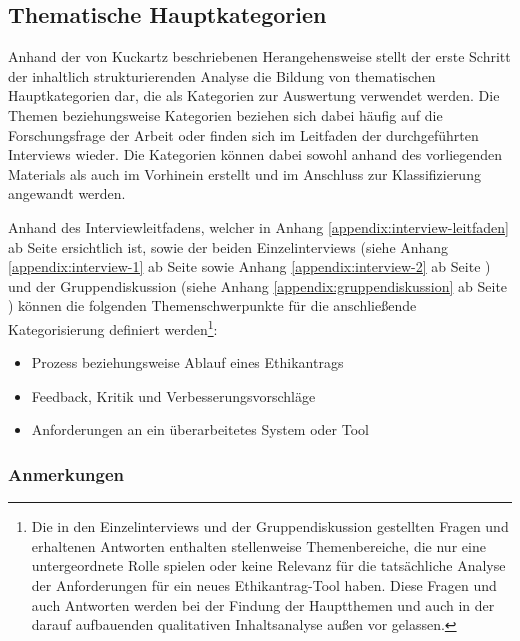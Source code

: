 \documentclass[a4paper,12pt,twoside,numbers=noendperiod]{scrreprt}
\begin{document}
\subsection{Thematische Hauptkategorien}
\label{sub-sec:thematische-hauptkategorien}

Anhand der von Kuckartz beschriebenen Herangehensweise stellt der erste Schritt der inhaltlich strukturierenden Analyse die Bildung von thematischen Hauptkategorien dar, die als Kategorien zur Auswertung verwendet werden. Die Themen beziehungsweise Kategorien beziehen sich dabei häufig auf die Forschungsfrage der Arbeit oder finden sich im Leitfaden der durchgeführten Interviews wieder. Die Kategorien können dabei sowohl anhand des vorliegenden Materials als auch im Vorhinein erstellt und im Anschluss zur Klassifizierung angewandt werden. \cite[101\psq]{kuckartz_qualitative_2018}

\medskip

Anhand des Interviewleitfadens, welcher in Anhang \ref{appendix:interview-leitfaden} ab Seite \pageref{appendix:interview-leitfaden} ersichtlich ist, sowie der beiden Einzelinterviews (siehe Anhang \ref{appendix:interview-1} ab Seite \pageref{appendix:interview-1} sowie Anhang \ref{appendix:interview-2} ab Seite \pageref{appendix:interview-2}) und der Gruppendiskussion (siehe Anhang \ref{appendix:gruppendiskussion} ab Seite \pageref{appendix:gruppendiskussion}) können die folgenden Themenschwerpunkte für die anschließende Kategorisierung definiert werden\footnote{Die in den Einzelinterviews und der Gruppendiskussion gestellten Fragen und erhaltenen Antworten enthalten stellenweise Themenbereiche, die nur eine untergeordnete Rolle spielen oder keine Relevanz für die tatsächliche Analyse der Anforderungen für ein neues Ethikantrag-Tool haben. Diese Fragen und auch Antworten werden bei der Findung der Hauptthemen und auch in der darauf aufbauenden qualitativen Inhaltsanalyse außen vor gelassen.}:
\begin{itemize}
    \item Prozess beziehungsweise Ablauf eines Ethikantrags
    \item Feedback, Kritik und Verbesserungsvorschläge
    \item Anforderungen an ein überarbeitetes System oder Tool
\end{itemize}

\subsubsection*{Anmerkungen}
\label{sub-sub-sec:thematische-hauptkategorien-anmerkungen}
\end{document}
